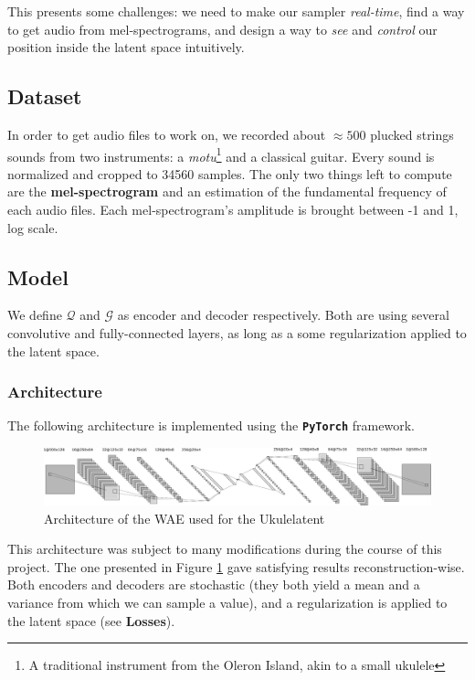 \documentclass[11pt, english]{article}
\begin{document}
This presents some challenges: we need to make our sampler \textit{real-time}, find a way to get audio from mel-spectrograms, and design a way to \textit{see} and \textit{control} our position inside the latent space intuitively.

\subsection{Dataset}

In order to get audio files to work on, we recorded about $\approx 500$ plucked strings sounds from two instruments: a \textit{motu}\footnote{A traditional instrument from the Oleron Island, akin to a small ukulele} and a classical guitar. Every sound is normalized and cropped to 34560 samples. The only two things left to compute are the \textbf{mel-spectrogram} and an estimation of the fundamental frequency of each audio files. Each mel-spectrogram's amplitude is brought between -1 and 1, log scale.

\subsection{Model}

We define $\mathcal Q$ and $\mathcal G$ as encoder and decoder respectively. Both are using several convolutive and fully-connected layers, as long as a some regularization applied to the latent space.

\subsubsection*{Architecture}

The following architecture is implemented using the \texttt{\textbf{PyTorch}} framework.

\begin{figure}[!h]
    \centering
    \includegraphics[width=\linewidth]{img/archi.eps}
    \caption{Architecture of the WAE used for the Ukulelatent}
    \label{fig:archi}
\end{figure}

This architecture was subject to many modifications during the course of this project. The one presented in Figure \ref{fig:archi} gave satisfying results reconstruction-wise. Both encoders and decoders are stochastic (they both yield a mean and a variance from which we can sample a value), and a regularization is applied to the latent space (see \textbf{Losses}).\\
\end{document}
